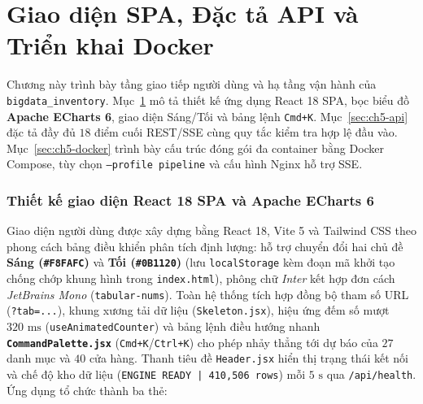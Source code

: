 \part{Giao diện SPA, Đặc tả API và Triển khai Docker}
\label{part:ch5}

Chương này trình bày tầng giao tiếp người dùng và hạ tầng vận hành của \texttt{bigdata_inventory}. Mục~\ref{sec:ch5-ui} mô tả thiết kế ứng dụng React 18 SPA, bọc biểu đồ \textbf{Apache ECharts 6}, giao diện Sáng/Tối và bảng lệnh \texttt{Cmd+K}. Mục~\ref{sec:ch5-api} đặc tả đầy đủ $18$ điểm cuối REST/SSE cùng quy tắc kiểm tra hợp lệ đầu vào. Mục~\ref{sec:ch5-docker} trình bày cấu trúc đóng gói đa container bằng Docker Compose, tùy chọn \texttt{--profile pipeline} và cấu hình Nginx hỗ trợ SSE.

\section{Thiết kế giao diện React 18 SPA và Apache ECharts 6}
\label{sec:ch5-ui}
Giao diện người dùng được xây dựng bằng React 18, Vite 5 và Tailwind CSS theo phong cách bảng điều khiển phân tích định lượng: hỗ trợ chuyển đổi hai chủ đề \textbf{Sáng (\texttt{\#F8FAFC})} và \textbf{Tối (\texttt{\#0B1120})} (lưu \texttt{localStorage} kèm đoạn mã khởi tạo chống chớp khung hình trong \texttt{index.html}), phông chữ \textit{Inter} kết hợp đơn cách \textit{JetBrains Mono} (\texttt{tabular-nums}). Toàn hệ thống tích hợp đồng bộ tham số URL (\texttt{?tab=...}), khung xương tải dữ liệu (\texttt{Skeleton.jsx}), hiệu ứng đếm số mượt $320\text{ ms}$ (\texttt{useAnimatedCounter}) và bảng lệnh điều hướng nhanh \textbf{\texttt{CommandPalette.jsx}} (\texttt{Cmd+K}/\texttt{Ctrl+K}) cho phép nhảy thẳng tới dự báo của $27$ danh mục và $40$ cửa hàng. Thanh tiêu đề \texttt{Header.jsx} hiển thị trạng thái kết nối và chế độ kho dữ liệu (\texttt{ENGINE READY | 410,506 rows}) mỗi $5\text{ s}$ qua \texttt{/api/health}. Ứng dụng tổ chức thành ba thẻ:
